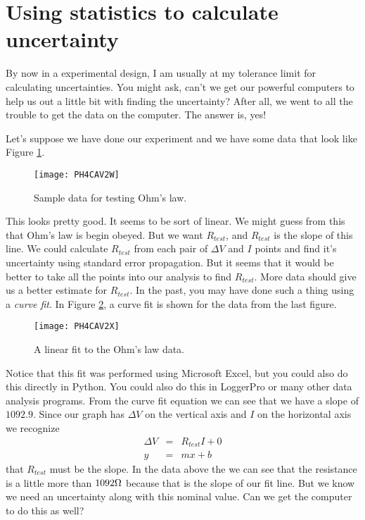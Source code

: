 \section{Using statistics to calculate uncertainty}

By now in a experimental design, I am usually at my tolerance limit for
calculating uncertainties. You might ask, can't we get our powerful
computers to help us out a little bit with finding the uncertainty? After
all, we went to all the trouble to get the data on the computer. The answer
is, yes!

Let's suppose we have done our experiment and we have some data that look
like Figure \ref{fig:ohmdata}. 
\begin{figure}[htbp!]
	\centering
\texttt{[image: PH4CAV2W]}
	\caption[Sample data for testing Ohm's law]{Sample data for testing 
	Ohm's law.}
	\label{fig:ohmdata}
\end{figure}

This looks pretty good. It seems to be sort of linear. We might guess from
this that Ohm's law is begin obeyed. But we want $R_{test}$, and $R_{test}$
is the slope of this line. We could calculate $R_{test}$ from each pair of $%
\Delta V$ and $I$ points and find it's uncertainty using standard error
propagation. But it seems that it would be better to take all the points
into our analysis to find $R_{test}.$ More data should give us a better
estimate for $R_{test}.$ In the past, you may have done such a thing using
a \emph{curve fit}. In Figure \ref{fig:ohmdata2}, 
a curve fit is shown for the data
from the last figure. 
\begin{figure}[htbp!]
	\centering
\texttt{[image: PH4CAV2X]}
	\caption[A linear fit to the Ohm's law data]{A linear fit to the Ohm's
	law data.}
	\label{fig:ohmdata2}
\end{figure}

Notice that this fit was performed using Microsoft Excel, but you
could also do this directly in Python. You could also
do this in LoggerPro or many other data analysis programs. From the curve
fit equation we can see that we have a slope of $1092.9.$ Since our graph
has $\Delta V$ on the vertical axis and $I$ on the horizontal axis we
recognize 
\begin{eqnarray*}
\Delta V &=&R_{test}I+0 \\
y &=&mx+b
\end{eqnarray*}%
that $R_{test}$ must be the slope. In the data above the we can see that the
resistance is a little more than $1092\unit{%
\Omega%
}$ because that is the slope of our fit line. But we know we need an
uncertainty along with this nominal value. Can we get the computer to do
this as well?

